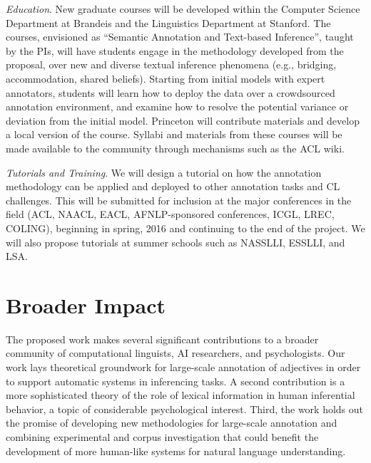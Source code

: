 \documentclass[10pt]{article}
\begin{document}
{\it Education}. New graduate courses will be developed within the Computer Science Department at Brandeis and  the Linguistics Department at Stanford. The courses, envisioned as  ``Semantic Annotation and Text-based Inference'', taught by the PIs, will have students engage in the methodology developed from the proposal, over new and diverse textual inference phenomena (e.g., bridging, accommodation, shared beliefs). Starting from initial models with expert annotators, students will learn how to deploy the data over a crowdsourced  annotation environment, and examine how to resolve the potential variance or deviation from the initial model. Princeton will contribute materials and develop a local version of the course.
Syllabi and materials from these courses will be made available to the community through mechanisms such as the ACL wiki.

{\it Tutorials and Training}.
We will design a tutorial on how the annotation methodology can be applied and deployed to other annotation tasks and CL challenges. This will be submitted for inclusion at the major conferences in the field (ACL, NAACL, EACL, AFNLP-sponsored conferences, ICGL, LREC, COLING), beginning in spring, 2016 and continuing to the end of the project. We will also propose tutorials at summer schools such as NASSLLI, ESSLLI, and LSA. 

\vspace {-5mm}
\section{Broader Impact}

\vspace {-3mm}

The proposed work  makes several significant contributions to a broader community of computational linguists, AI researchers, and psychologists. 
Our work lays theoretical groundwork for large-scale annotation of adjectives in order to support automatic systems in inferencing tasks. 
A second contribution is a more sophisticated theory of the role of lexical information in human inferential behavior, a topic of considerable psychological interest.
Third, the work holds out the promise of developing new methodologies for large-scale annotation and combining experimental and corpus investigation that could benefit the development of more human-like systems for natural language understanding.
  
\end{document}
